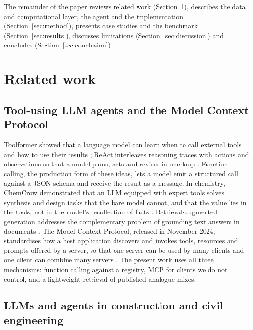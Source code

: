 \documentclass[preprint,12pt]{elsarticle}
\begin{document}
The remainder of the paper reviews related work (Section~\ref{sec:related}), describes the data and computational layer, the agent and the implementation (Section~\ref{sec:method}), presents case studies and the benchmark (Section~\ref{sec:results}), discusses limitations (Section~\ref{sec:discussion}) and concludes (Section~\ref{sec:conclusion}).

\section{Related work}\label{sec:related}

\subsection{Tool-using LLM agents and the Model Context Protocol}

Toolformer showed that a language model can learn when to call external tools and how to use their results \cite{schick2023toolformer}; ReAct interleaves reasoning traces with actions and observations so that a model plans, acts and revises in one loop \cite{yao2023react}. Function calling, the production form of these ideas, lets a model emit a structured call against a JSON schema and receive the result as a message. In chemistry, ChemCrow demonstrated that an LLM equipped with expert tools solves synthesis and design tasks that the bare model cannot, and that the value lies in the tools, not in the model's recollection of facts \cite{bran2024chemcrow}. Retrieval-augmented generation addresses the complementary problem of grounding text answers in documents \cite{gao2023rag}. The Model Context Protocol, released in November 2024, standardises how a host application discovers and invokes tools, resources and prompts offered by a server, so that one server can be used by many clients and one client can combine many servers \cite{anthropic2024mcp,hou2025mcp}. The present work uses all three mechanisms: function calling against a registry, MCP for clients we do not control, and a lightweight retrieval of published analogue mixes.

\subsection{LLMs and agents in construction and civil engineering}
\end{document}
